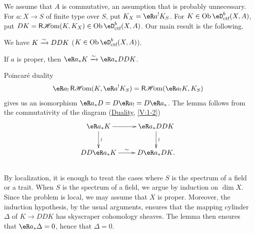\subsection{}\label{VII:4-2}

We assume that $A$ is commutative, an assumption that is probably
unnecessary. For $a:X\to S$ of finite type over $S$, put
$K_X=\eR a^! K_S$. For $K\in\ob\eD_\text{ctf}^b(X,A)$, put
$D K=\rHom(K,K_X)\in\ob\eD_\text{ctf}^b(X,A)$. Our main result is the
following.





\begin{theorem_}\label{VII:4-3}
We have $K\xrightarrow\sim D D K$ ($K\in \ob\eD_\textnormal{ctf}^b(X,A)$).
\end{theorem_}





\begin{lemma_}\label{VII:4-4}
If $a$ is proper, then $\eR a_\ast K \iso \eR a_\ast D D K$.
\end{lemma_}

Poincaré duality
\[
  \eR a_! \rHom(K,\eR a^! K_S) = \rHom(\eR a_! K,K_S) 
\]
gives us an isomorphism $\eR a_\ast D = D \eR a_! = D \eR a_\ast$. The lemma
follows from the commutativity of the diagram (\hyperref[V]{Duality},
\ref{V:1-2})
\[\xymatrix{
  \eR a_\ast K \ar[r] \ar[d]^-\wr 
    & \eR a_\ast D D K \ar[d]^-\wr \\
  D D \eR a_\ast K \ar[r]^-\sim 
    & D \eR a_\ast D K \text{.} 
}\]





\subsection{}\label{VII:4-5}

By localization, it is enough to treat the cases where $S$ is the spectrum
of a field or a trait. When $S$ is the spectrum of a field, we argue by
induction on $\dim X$. Since the problem is local, we may assume that $X$ is
proper. Moreover, the induction hypothesis, by the usual arguments, ensures
that the mapping cylinder $\Delta$ of $K\to D D K$ has skyscraper cohomology
sheaves. The lemma then ensures that $\eR a_\ast \Delta=0$, hence that
$\Delta=0$.





\subsection{}\label{VII:4-6}

